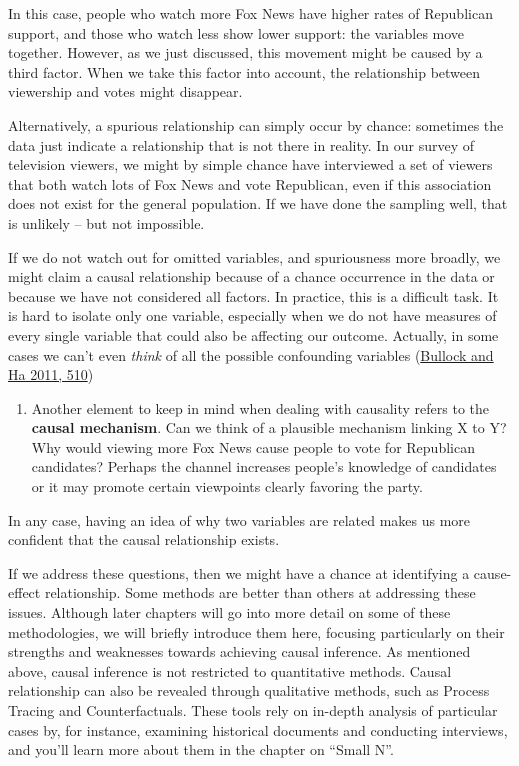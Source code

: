 \documentclass{book}
\providecommand{\tightlist}{%
  \setlength{\itemsep}{0pt}\setlength{\parskip}{0pt}}
\begin{document}
In this case, people who watch more Fox News have higher rates of Republican
support, and those who watch less show lower support: the variables move
together. However, as we just discussed, this movement might be caused by a
third factor. When we take this factor into account, the relationship between
viewership and votes might disappear.

Alternatively, a spurious relationship can simply occur by chance: sometimes
the data just indicate a relationship that is not there in reality. In our
survey of television viewers, we might by simple chance have interviewed a set
of viewers that both watch lots of Fox News and vote Republican, even if this
association does not exist for the general population. If we have done the
sampling well, that is unlikely -- but not impossible.

If we do not watch out for omitted variables, and spuriousness more broadly,
we might claim a causal relationship because of a chance occurrence in the
data or because we have not considered all factors. In practice, this is a
difficult task. It is hard to isolate only one variable, especially when we do
not have measures of every single variable that could also be affecting our
outcome. Actually, in some cases we can't even \emph{think} of all the
possible confounding variables
(\protect\hyperlink{ref-bullockMediationAnalysisHarder2011}{Bullock and Ha
2011, 510})

\begin{enumerate}
\def\labelenumi{\arabic{enumi}.}
\setcounter{enumi}{4}
\tightlist
\item
  Another element to keep in mind when dealing with causality refers to the
  \textbf{causal mechanism}. Can we think of a plausible mechanism linking X
  to Y? Why would viewing more Fox News cause people to vote for Republican
  candidates? Perhaps the channel increases people's knowledge of candidates
  or it may promote certain viewpoints clearly favoring the party.
\end{enumerate}

In any case, having an idea of why two variables are related makes us more
confident that the causal relationship exists.

If we address these questions, then we might have a chance at identifying a
cause-effect relationship. Some methods are better than others at addressing
these issues. Although later chapters will go into more detail on some of
these methodologies, we will briefly introduce them here, focusing
particularly on their strengths and weaknesses towards achieving causal
inference. As mentioned above, causal inference is not restricted to
quantitative methods. Causal relationship can also be revealed through
qualitative methods, such as Process Tracing and Counterfactuals. These tools
rely on in-depth analysis of particular cases by, for instance, examining
historical documents and conducting interviews, and you'll learn more about
them in the chapter on ``Small N''.
\end{document}
